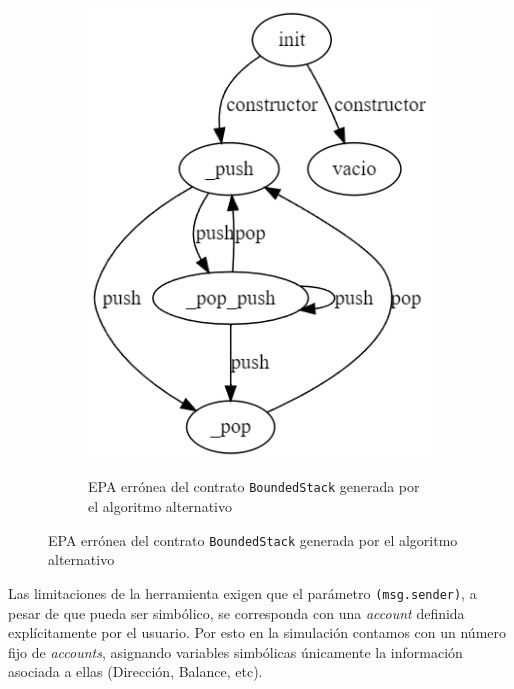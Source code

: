 \begin{figure}
\begin{subfigure}{0.45\textwidth}
        {\includegraphics[width=\textwidth]{figs/bonded-stack-bad-epa.png}}
        \caption{EPA errónea del contrato \texttt{BoundedStack} generada por el algoritmo alternativo}
        \label{fig:bounded-stack-bad-epa}
    \end{subfigure}
\end{figure}


Las limitaciones de la herramienta exigen que el parámetro \texttt{(msg.sender)}, a pesar de que pueda ser simbólico, se corresponda con una \textit{account} definida explícitamente por el usuario.
Por esto en la simulación contamos con un número fijo de \textit{accounts}, asignando variables simbólicas únicamente la información asociada a ellas (Dirección, Balance, etc).

